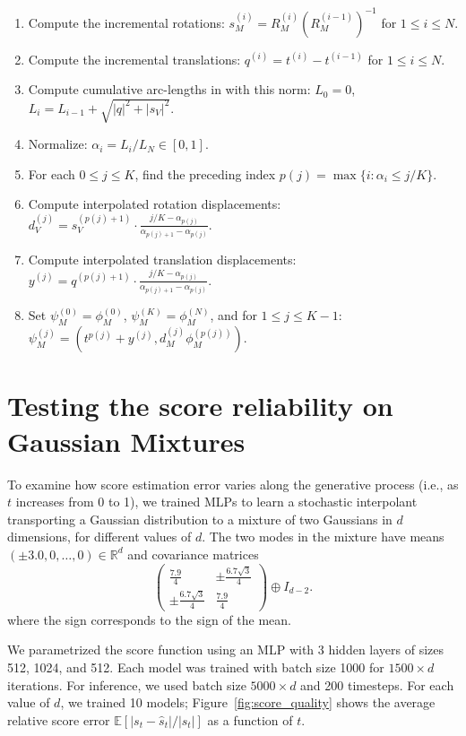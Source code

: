 \documentclass{article}
\theoremstyle{plain}
\theoremstyle{definition}
\theoremstyle{remark}
\begin{document}
\begin{enumerate}
    \item Compute the incremental rotations: $s^{(i)}_M = R^{(i)}_M (R^{(i-1)}_M)^{-1}$ for $1 \le i \le N$.
    \item Compute the incremental translations: $q^{(i)} = t^{(i)} - t^{(i-1)}$ for $1 \le i \le N$.
    \item Compute cumulative arc-lengths in with this norm: $L_0 = 0$, $L_i = L_{i-1} + \sqrt{|q|^2 + |s_V|^2}$.
    \item Normalize: $\alpha_i = L_i / L_N \in [0,1]$.
    \item For each $0 \le j \le K$, find the preceding index $p(j) = \max\{i : \alpha_i \le j/K\}$.
    \item Compute interpolated rotation displacements: $d^{(j)}_V = s^{(p(j)+1)}_V \cdot \frac{j/K - \alpha_{p(j)}}{\alpha_{p(j)+1} - \alpha_{p(j)}}$.
    \item Compute interpolated translation displacements: $y^{(j)} = q^{(p(j)+1)} \cdot \frac{j/K - \alpha_{p(j)}}{\alpha_{p(j)+1} - \alpha_{p(j)}}$.
    \item Set $\psi^{(0)}_M = \phi^{(0)}_M$, $\psi^{(K)}_M = \phi^{(N)}_M$, and for $1 \le j \le K-1$: $\psi^{(j)}_M = (t^{p(j)} + y^{(j)},d^{(j)}_M \phi^{(p(j))}_M)$.
\end{enumerate}

\section{Testing the score reliability on Gaussian Mixtures}
\label{app:testing}

To examine how score estimation error varies along the generative process (i.e., as $t$ increases from 0 to 1), we trained MLPs to learn a stochastic interpolant transporting a Gaussian distribution to a mixture of two Gaussians in $d$ dimensions, for different values of $d$. The two modes in the mixture have means $(\pm 3.0, 0, \ldots, 0) \in \mathbb{R}^d$ and covariance matrices
\[
\begin{pmatrix}
    \frac{7.9}{4} & \pm\frac{6.7\sqrt{3}}{4} \\[4pt] \pm\frac{6.7\sqrt{3}}{4} & \frac{7.9}{4} 
\end{pmatrix}
\oplus I_{d-2}.
\]
where the sign corresponds to the sign of the mean.

We parametrized the score function using an MLP with 3 hidden layers of sizes 512, 1024, and 512. Each model was trained with batch size 1000 for $1500 \times d$ iterations. For inference, we used batch size $5000 \times d$ and 200 timesteps. For each value of $d$, we trained 10 models; Figure~\ref{fig:score_quality} shows the average relative score error $\mathbb{E}[|s_t - \hat{s}_t|/|s_t|]$ as a function of $t$.
\end{document}
